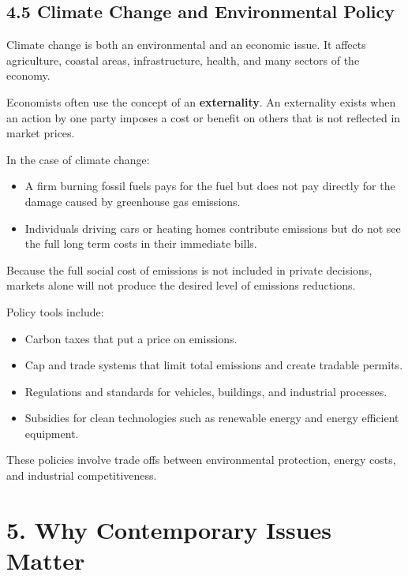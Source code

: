 \documentclass[12pt]{article}
\begin{document}
\subsection*{4.5 Climate Change and Environmental Policy}

Climate change is both an environmental and an economic issue. It affects agriculture, coastal areas, infrastructure, health, and many sectors of the economy.

Economists often use the concept of an \textbf{externality}. An externality exists when an action by one party imposes a cost or benefit on others that is not reflected in market prices.

In the case of climate change:

\begin{itemize}[noitemsep]
    \item A firm burning fossil fuels pays for the fuel but does not pay directly for the damage caused by greenhouse gas emissions.
    \item Individuals driving cars or heating homes contribute emissions but do not see the full long term costs in their immediate bills.
\end{itemize}

Because the full social cost of emissions is not included in private decisions, markets alone will not produce the desired level of emissions reductions.

Policy tools include:

\begin{itemize}[noitemsep]
    \item Carbon taxes that put a price on emissions.
    \item Cap and trade systems that limit total emissions and create tradable permits.
    \item Regulations and standards for vehicles, buildings, and industrial processes.
    \item Subsidies for clean technologies such as renewable energy and energy efficient equipment.
\end{itemize}

These policies involve trade offs between environmental protection, energy costs, and industrial competitiveness.

\newpage

\section*{5. Why Contemporary Issues Matter}
\end{document}
